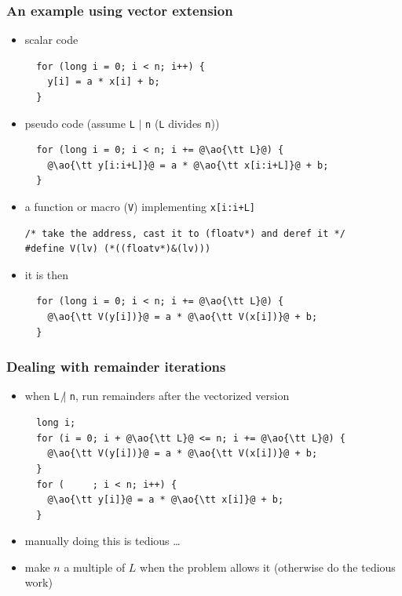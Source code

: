 \documentclass[12pt,dvipdfmx]{beamer}
\newcommand{\mura}[1]{{\color{purple}#1}}
\newcommand{\ao}[1]{{\color{blue}#1}}
\begin{document}
\begin{frame}[fragile]
\frametitle{An example using vector extension}
\begin{itemize}
\item scalar code
\begin{lstlisting}
  for (long i = 0; i < n; i++) {
    y[i] = a * x[i] + b;
  }
\end{lstlisting}

\item pseudo code (\mura{assume {\tt L} $|$ {\tt n} ({\tt L} divides {\tt n})})
\begin{lstlisting}
  for (long i = 0; i < n; i += @\ao{\tt L}@) {
    @\ao{\tt y[i:i+L]}@ = a * @\ao{\tt x[i:i+L]}@ + b;
  }
\end{lstlisting}

\item a function or macro (\ao{\tt V}) implementing \ao{\tt x[i:i+L]}
\begin{lstlisting}
/* take the address, cast it to (floatv*) and deref it */
#define V(lv) (*((floatv*)&(lv)))
\end{lstlisting}
\item it is then
\begin{lstlisting}
  for (long i = 0; i < n; i += @\ao{\tt L}@) {
    @\ao{\tt V(y[i])}@ = a * @\ao{\tt V(x[i])}@ + b;
  }
\end{lstlisting}

\end{itemize}
\end{frame}

\begin{frame}[fragile]
\frametitle{Dealing with remainder iterations}
\begin{itemize}
\item when {\tt L} $\not|$ {\tt n}, run remainders after the vectorized version
\begin{lstlisting}
  long i;
  for (i = 0; i + @\ao{\tt L}@ <= n; i += @\ao{\tt L}@) {
    @\ao{\tt V(y[i])}@ = a * @\ao{\tt V(x[i])}@ + b;
  }
  for (     ; i < n; i++) {
    @\ao{\tt y[i]}@ = a * @\ao{\tt x[i]}@ + b;
  }
\end{lstlisting}

\item manually doing this is tedious \ldots
\item make $n$ a multiple of $L$ when the problem allows it
  (otherwise do the tedious work)
\end{itemize}
\end{frame}
\end{document}
